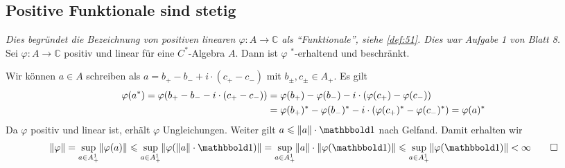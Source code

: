 

\subsection{Positive Funktionale sind stetig} %
\label{sub:positive_funktionale_sind_stetig}
\emph{Dies begründet die Bezeichnung von positiven linearen $\varphi\colon A \to \mathbb{C}$ als \enquote{Funktionale}, siehe \autoref{def:51}. Dies war Aufgabe 1 von Blatt 8.}\smallskip\\
Sei $\varphi\colon A \to \mathbb{C}$ positiv und linear für eine $C^*$-Algebra $A$.
Dann ist $\varphi$ $^*$-erhaltend und beschränkt.
\begin{beweis}
	Wir können $a \in A$ schreiben als $a= b_+ -b_- +i \cdot (c_+ - c_-)$ mit $b_\pm,c_\pm \in A_+$.
	Es gilt
	\begin{align}
		\varphi(a^*) = \varphi \enbrace*{b_+ -b_- - i \cdot (c_+ - c_-)} &= \varphi(b_+) - \varphi(b_-) - i \cdot \enbrace*{\varphi(c_+) - \varphi(c_-)} \\
		&= \varphi(b_+)^* - \varphi(b_-)^* - i \cdot  \enbrace*{\varphi(c_+)^* - \varphi(c_-)^*} = \varphi(a)^*
	\end{align}
	Da $\varphi$ positiv und linear ist, erhält $\varphi$ Ungleichungen.
	Weiter gilt $a \le \norm*{a} \cdot \ind$ nach Gelfand.
	Damit erhalten wir
	\[
		\norm*{\varphi} = \sup_{a \in A_+^1} \norm*{\varphi(a)} \le \sup_{a \in A_+^1} \norm*{\varphi \enbrace*{\norm*{a} \cdot \ind}} = \sup_{a \in A_+^1} \norm*{a} \cdot \norm*{\varphi(\ind)} \le \sup_{a \in A_+^1} \norm*{\varphi(\ind)} < \infty \qedhere
	\]
\end{beweis}

